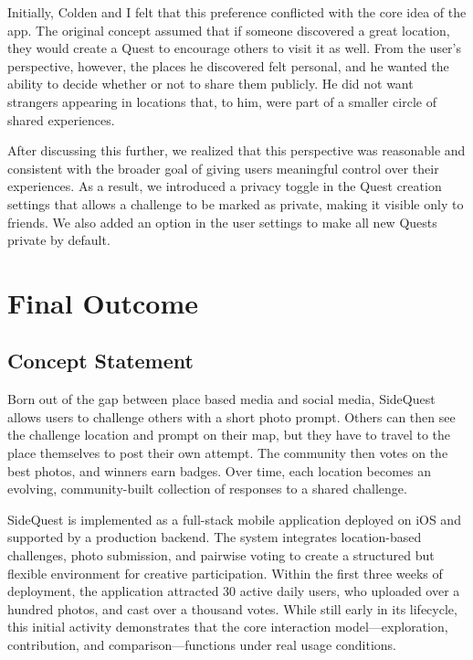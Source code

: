 \documentclass[12pt,a4paper,oneside]{report}
\begin{document}
Initially, Colden and I felt that this preference conflicted with the core idea of the app. The original concept assumed that if someone discovered a great location, they would create a Quest to encourage others to visit it as well. From the user’s perspective, however, the places he discovered felt personal, and he wanted the ability to decide whether or not to share them publicly. He did not want strangers appearing in locations that, to him, were part of a smaller circle of shared experiences.

After discussing this further, we realized that this perspective was reasonable and consistent with the broader goal of giving users meaningful control over their experiences. As a result, we introduced a privacy toggle in the Quest creation settings that allows a challenge to be marked as private, making it visible only to friends. We also added an option in the user settings to make all new Quests private by default.

\chapter{Final Outcome}
\label{ch:final}

\section{Concept Statement}
Born out of the gap between place based media and social media, SideQuest allows users to challenge others with a short photo prompt. Others can then see the challenge location and prompt on their map, but they have to travel to the place themselves to post their own attempt. The community then votes on the best photos, and winners earn badges. Over time, each location becomes an evolving, community-built collection of responses to a shared challenge.

SideQuest is implemented as a full-stack mobile application deployed on iOS and supported by a production backend. The system integrates location-based challenges, photo submission, and pairwise voting to create a structured but flexible environment for creative participation. Within the first three weeks of deployment, the application attracted 30 active daily users, who uploaded over a hundred photos, and cast over a thousand votes. While still early in its lifecycle, this initial activity demonstrates that the core interaction model—exploration, contribution, and comparison—functions under real usage conditions. 
\end{document}
